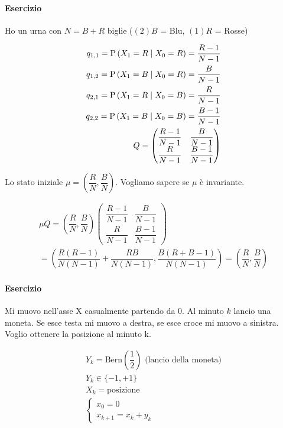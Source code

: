 \paragraph{Esercizio}

Ho un urna con $ N = B + R$ biglie ($(2) B $ = Blu, $ (1) R $ = Rosse)

\[ \begin{aligned}
q_{1,1} = \text{P}\left(X_1 = R \mid X_0 = R\right) = \dfrac{R-1}{N-1} \\
q_{1,2} = \text{P}\left(X_1 = B \mid X_0 = R\right) = \dfrac{B}{N-1} \\
q_{2,1} = \text{P}\left(X_1 = R \mid X_0 = B\right) = \dfrac{R}{N-1} \\
q_{2,2} = \text{P}\left(X_1 = B \mid X_0 = B\right) = \dfrac{B-1}{N-1} \\
Q = \begin{pmatrix}
\dfrac{R-1}{N-1} & \dfrac{B}{N-1} \\
\dfrac{R}{N-1} & \dfrac{B-1}{N-1}
\end{pmatrix}
\end{aligned} \]

Lo stato iniziale $ \mu = \left(\dfrac{R}{N}, \dfrac{B}{N}\right) $. Vogliamo sapere se $ \mu $ è invariante.

\[ \begin{aligned}
\mu Q = \left(\dfrac{R}{N}, \dfrac{B}{N}\right)\begin{pmatrix}
\dfrac{R-1}{N-1} & \dfrac{B}{N-1} \\
\dfrac{R}{N-1} & \dfrac{B-1}{N-1}
\end{pmatrix} \\
= \left(\dfrac{R(R-1)}{N(N-1)} + \dfrac{RB}{N(N-1)}, \dfrac{B(R+B-1)}{N(N-1)}\right) = \left(\dfrac{R}{N}, \dfrac{B}{N}\right)
\end{aligned} \]

\paragraph{Esercizio}

Mi muovo nell'asse X casualmente partendo da 0. Al minuto $ k $ lancio una moneta. Se esce testa mi muovo a destra, se esce croce mi muovo a sinistra. Voglio ottenere la posizione al minuto k.

\[ \begin{aligned}
Y_k = \text{Bern}\left(\dfrac{1}{2}\right) \text{ (lancio della moneta)}\\
Y_k \in \{-1, +1\} \\
X_k = \text{posizione} \\
\begin{cases}
	x_0 = 0 \\
	x_{k+1} = x_k + y_k
\end{cases}
\end{aligned} \]

